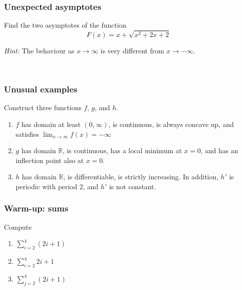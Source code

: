 \documentclass[14pt]{beamer}
\begin{document}
\begin{frame}[t]
	\frametitle{Unexpected asymptotes}

	Find the two asymptotes of the function
	\[
		F(x) = x + \sqrt{x^{2}+2x+ 2}
	\]

	\emph{Hint:} The behaviour as $x \to \infty$ is very different from
	$x \to - \infty$.

	\ \hfill \href{https://www.desmos.com/calculator/kffnbl6pnc}{}
\end{frame}

\begin{frame}[t]
	\frametitle{Unusual examples}

	Construct three functions $f$, $g$, and $h$.

	\begin{enumerate}
		\item $f$ has domain at least $(0,\infty)$, is continuous, is always concave
			up, and satisfies $\displaystyle \lim_{x \to \infty}f(x) = - \infty$

		\item $g$ has domain $\mathbb{R}$, is continuous, has a local minimum at $x=0$,
			and has an inflection point also at $x=0$.

		\item $h$ has domain $\mathbb{R}$, is differentiable, is strictly increasing.
			In addition, $h'$ is periodic with period $2$, and $h'$ is not constant.
	\end{enumerate}
\end{frame}

\begin{frame}[t]
	\frametitle{Warm-up: sums}

	Compute

	\begin{enumerate}
		\item $\displaystyle \sum_{i=2}^{4}(2i+1)$
			\vfill

		\item $\displaystyle \sum_{i=2}^{4}2i + 1$
			\vfill

		\item $\displaystyle \sum_{j=2}^{4}(2i + 1)$
			\vfill
	\end{enumerate}
\end{frame}
\end{document}
